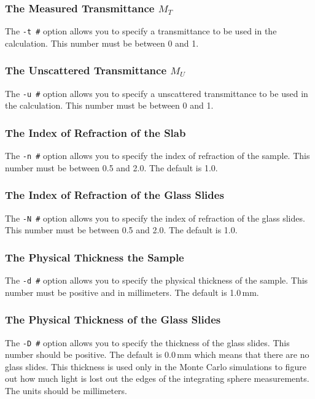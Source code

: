 \documentclass{article}
\begin{document}
\subsubsection{The Measured Transmittance $M_T$}
The \texttt{-t \#} option allows you to specify a transmittance to be
used in the calculation.  This number must be between 0 and 1.

\subsubsection{The Unscattered Transmittance $M_U$}
The \texttt{-u \#} option allows you to specify a unscattered transmittance to be
used in the calculation.  This number must be between 0 and 1.

\subsubsection{The Index of Refraction of the Slab}
The \texttt{-n \#} option allows you to specify the index of refraction of
the sample.  This number must be between 0.5 and 2.0.  The default is 1.0.

\subsubsection{The Index of Refraction of the Glass Slides}
The \texttt{-N \#} option allows you to specify the index of refraction of
the glass slides.  This number must be between 0.5 and 2.0.  The default is 1.0.

\subsubsection{The Physical Thickness the Sample}
The \texttt{-d \#} option allows you to specify the physical thickness of
the sample.  This number must be positive and in millimeters.  The default is 1.0\,mm.

\subsubsection{The Physical Thickness of the Glass Slides}
The \texttt{-D \#} option allows you to specify the thickness of
the glass slides.  This number should be positive.  The default is 0.0\,mm
which means that there are no glass slides.  This thickness is used
only in the Monte Carlo simulations to figure out how much light is lost
out the edges of the integrating sphere measurements.  The units should be
millimeters.
\end{document}
